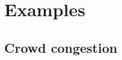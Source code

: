 \documentclass{article}
\begin{document}
    
    \section{Examples}
    
    \subsection{Crowd congestion}
    
    
    
    
    \printbibliography{}
    
    
    
    
    
    
    
\end{document}
